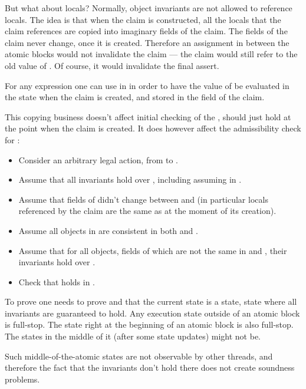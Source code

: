 But what about locals?
Normally, object invariants are not allowed to reference locals.
The idea is that when the claim is constructed, all the locals that the
claim references are copied into imaginary fields of the claim.
The fields of the claim never change, once it is created.
Therefore an assignment  in between the atomic
blocks would not invalidate the claim --- the claim would still
refer to the old value of .
Of course, it would invalidate the final  assert.

\begin{note}
For any expression  one can use  in 
in order to have the value of  be evaluated in the state
when the claim is created, and stored in the field of the claim.
\end{note}

This copying business doesn't affect initial checking of the ,
 should just hold at the point when the claim is created.
It does however affect the admissibility check for :
\begin{itemize}
\item Consider an arbitrary legal action, from  to .
\item Assume that all invariants hold over , including assuming  in .
\item Assume that fields of  didn't change between  and 
(in particular locals referenced by the claim are the same as at the moment of its creation).
\item Assume all objects in  are consistent in both  and .
\item Assume that for all objects, fields of which are not the same in  and ,
their invariants hold over .
\item Check that  holds in .
\end{itemize}

To prove  one needs to prove  and that
the current state is a  state, \ie state where all invariants
are guaranteed to hold.
Any execution state outside of an atomic block is full-stop.
The state right at the beginning of an atomic block is also full-stop.
The states in the middle of it (\ie after some state updates) might not be.

\begin{note}
Such middle-of-the-atomic states are not observable by other threads, and therefore
the fact that the invariants don't hold there does not create soundness problems.
\end{note}

